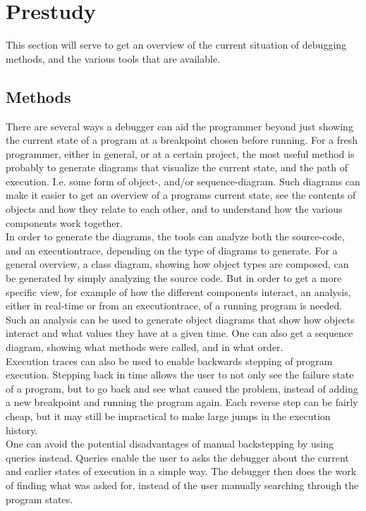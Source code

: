\chapter{Prestudy}\label{prestudy}%
This section will serve to get an overview of the current situation of debugging methods, and the various tools that are available.
\section{Methods}\label{preMethods}
There are several ways a debugger can aid the programmer beyond just showing the current state of a program at a \gls{breakpoint} chosen before running.
For a fresh programmer, either in general, or at a certain project, the most useful method is probably to generate diagrams that visualize the current state, and the path of execution.
I.e. some form of object-, and/or sequence-diagram.
Such diagrams can make it easier to get an overview of a programs current state, see the contents of objects and how they relate to each other, and to understand how the various components work together.
~\\

In order to generate the diagrams, the tools can analyze both the source-code, and an \gls{executiontrace}, depending on the type of diagrams to generate.
For a general overview, a class diagram, showing how object types are composed, can be generated by simply analyzing the source code.
But in order to get a more specific view, for example of how the different components interact, an analysis, either in real-time or from an \gls{executiontrace}, of a running program is needed.
Such an analysis can be used to generate object diagrams that show how objects interact and what values they have at a given time.
One can also get a sequence diagram, showing what methods were called, and in what order.
~\\

Execution traces can also be used to enable backwards stepping of program execution.
Stepping back in time allows the user to not only see the failure state of a program, but to go back and see what caused the problem, instead of adding a new \gls{breakpoint} and running the program again.
Each reverse step can be fairly cheap, but it may still be impractical to make large jumps in the execution history.
~\\

One can avoid the potential disadvantages of manual backstepping by using queries instead.
Queries enable the user to asks the debugger about the current and earlier states of execution in a simple way.
The debugger then does the work of finding what was asked for, instead of the user manually searching through the program states.
~\\

